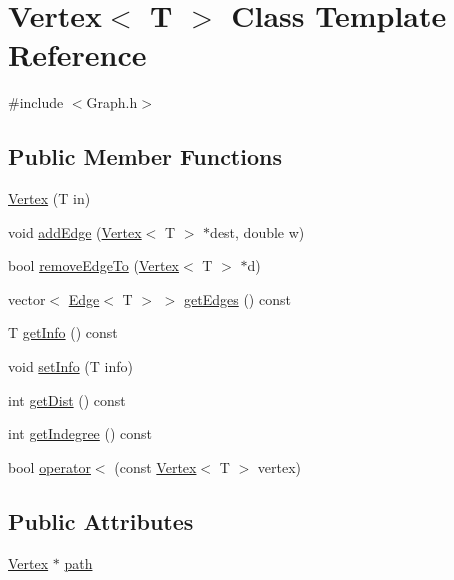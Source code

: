 \hypertarget{class_vertex}{}\section{Vertex$<$ T $>$ Class Template Reference}
\label{class_vertex}


{\ttfamily \#include $<$Graph.\+h$>$}

\subsection*{Public Member Functions}
\begin{DoxyCompactItemize}
\item 
\hyperlink{class_vertex_afcbdd4d4198b672356559cb8fa088408}{Vertex} (T in)
\item 
void \hyperlink{class_vertex_aeb024eced2da142912f189af6a454db3}{add\+Edge} (\hyperlink{class_vertex}{Vertex}$<$ T $>$ $\ast$dest, double w)
\item 
bool \hyperlink{class_vertex_ab2b5b43fb1709a901b78718436763a84}{remove\+Edge\+To} (\hyperlink{class_vertex}{Vertex}$<$ T $>$ $\ast$d)
\item 
vector$<$ \hyperlink{class_edge}{Edge}$<$ T $>$ $>$ \hyperlink{class_vertex_a2498749732978ed8fb0bb46a0be13672}{get\+Edges} () const 
\item 
T \hyperlink{class_vertex_a5880b4b252ae6818819c2f9645784b59}{get\+Info} () const 
\item 
void \hyperlink{class_vertex_a31cd60c26640f8072a928ba70eb2f95e}{set\+Info} (T info)
\item 
int \hyperlink{class_vertex_a3379c6cbcf1eaacc098381e3557a0b52}{get\+Dist} () const 
\item 
int \hyperlink{class_vertex_a305ef01582f945f22134abb9294fe1f3}{get\+Indegree} () const 
\item 
bool \hyperlink{class_vertex_a7091b26f281a5041b1775a3d3f9cb7a6}{operator$<$} (const \hyperlink{class_vertex}{Vertex}$<$ T $>$ vertex)
\end{DoxyCompactItemize}
\subsection*{Public Attributes}
\begin{DoxyCompactItemize}
\item 
\hyperlink{class_vertex}{Vertex} $\ast$ \hyperlink{class_vertex_abd40febd917aa25add6bd42237c8463a}{path}
\end{DoxyCompactItemize}
